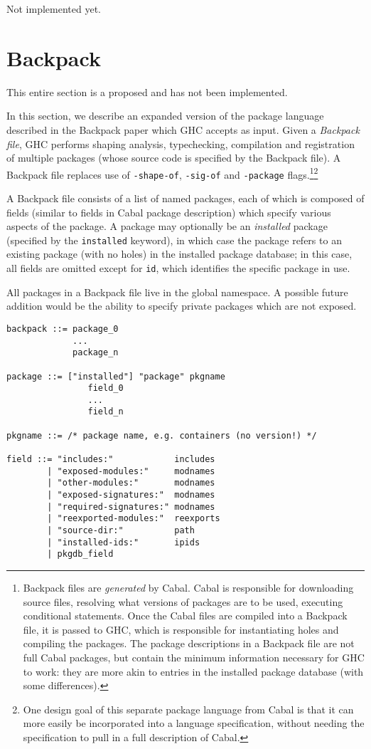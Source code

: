 \documentclass{article}
\newcommand{\Red}[1]{{\color{red} #1}}
\begin{document}
\Red{Not implemented yet.}

\section{Backpack}

\Red{This entire section is a proposed and has not been implemented.}

In this section, we describe an expanded version of the package language
described in the Backpack paper which GHC accepts as input.  Given a
\emph{Backpack file}, GHC performs shaping analysis, typechecking,
compilation and registration of multiple packages (whose source code is
specified by the Backpack file).  A Backpack file replaces use of
\texttt{-shape-of}, \texttt{-sig-of} and \texttt{-package} flags.\footnote{Backpack files are \emph{generated} by Cabal.  Cabal is responsible for downloading source files, resolving what versions of packages are to be used, executing conditional statements.  Once the Cabal files are compiled into a Backpack file, it is passed to GHC, which is responsible for instantiating holes and compiling the packages.  The package descriptions in a Backpack file are not full Cabal packages, but contain the minimum information necessary for GHC to work: they are more akin to entries in the installed package database (with some differences).}\footnote{One design goal of this separate package language from Cabal is that it can more easily be incorporated into a language specification, without needing the specification to pull in a full description of Cabal.}

A Backpack file consists of a list of named packages, each of which
is composed of fields (similar to fields in Cabal package description)
which specify various aspects of the package.  A package may optionally
be an \emph{installed} package (specified by the \texttt{installed}
keyword), in which case the package refers to an existing package
(with no holes) in the installed package database; in this case,
all fields are omitted except for \texttt{id}, which identifies the
specific package in use.

All packages in a Backpack file live in the global namespace.
\Red{A possible future addition would be the ability to specify private
packages which are not exposed.}

\begin{verbatim}
backpack ::= package_0
             ...
             package_n

package ::= ["installed"] "package" pkgname
                field_0
                ...
                field_n

pkgname ::= /* package name, e.g. containers (no version!) */

field ::= "includes:"            includes
        | "exposed-modules:"     modnames
        | "other-modules:"       modnames
        | "exposed-signatures:"  modnames
        | "required-signatures:" modnames
        | "reexported-modules:"  reexports
        | "source-dir:"          path
        | "installed-ids:"       ipids
        | pkgdb_field
\end{verbatim}
\end{document}

